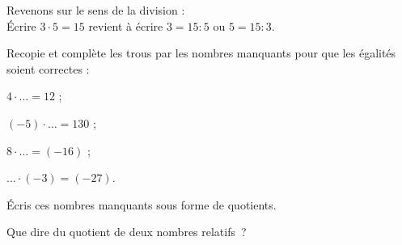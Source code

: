 
\begin{activite}

Revenons sur le sens de la division : \\[0.5em]
Écrire $3 \cdot 5 = 15$ revient à écrire $3 = 15 : 5$ ou $5 = 15 : 3$.
       
\begin{partie}
Recopie et complète les trous par les nombres manquants pour que les égalités soient correctes :
\begin{colenumerate}{4}
 \item $4 \cdot  \ldots = 12$ ;
 \item $(-5) \cdot  \ldots = 130$ ;
 \item $8 \cdot  \ldots = (-16)$ ;
 \item $ \ldots \cdot (-3) = (-27)$.
 \end{colenumerate}
\end{partie}

\begin{partie}
Écris ces nombres manquants sous forme de quotients.
\end{partie}

\begin{partie}
Que dire du quotient de deux nombres relatifs ?
\end{partie}

\end{activite}


